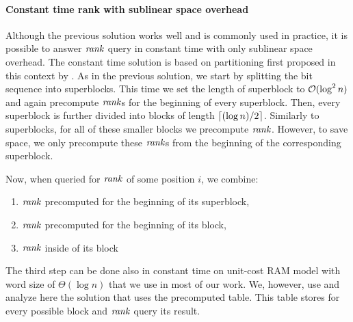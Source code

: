 \paragraph{Constant time rank with sublinear space overhead}

Although the previous solution works well and is commonly used in practice, it is possible to
answer $\mathit{rank}$ query in constant time with only sublinear space overhead. The constant time
solution is based on partitioning first proposed in this context by \cite{okanohara2007practical}.
As in the previous solution, we start by splitting the bit sequence into superblocks. This time
we set the length of superblock to $\mathcal{O}(\log^2 n)$ and again precompute $\mathit{rank}$s for the beginning of
every superblock. Then, every superblock is further divided into blocks of length $\left\lceil (\log n)/2 \right\rceil$.
Similarly to superblocks, for all of these smaller blocks we precompute $\mathit{rank}$. However, to save space,
we only precompute these $\mathit{rank}$s from the beginning of the corresponding superblock.

Now, when queried for $\mathit{rank}$ of some position $i$, we combine:
\begin{enumerate}
    \item $\mathit{rank}$ precomputed for the beginning of its superblock,
    \item $\mathit{rank}$ precomputed for the beginning of its block,
    \item $\mathit{rank}$ inside of its block
\end{enumerate}

The third step can be done also in constant time on unit-cost RAM model with word size of $\Theta(\log n)$
that we use in most of our work. We, however, use and analyze here the solution that uses the precomputed table.
This table stores for every possible block and $\mathit{rank}$ query its result. 

